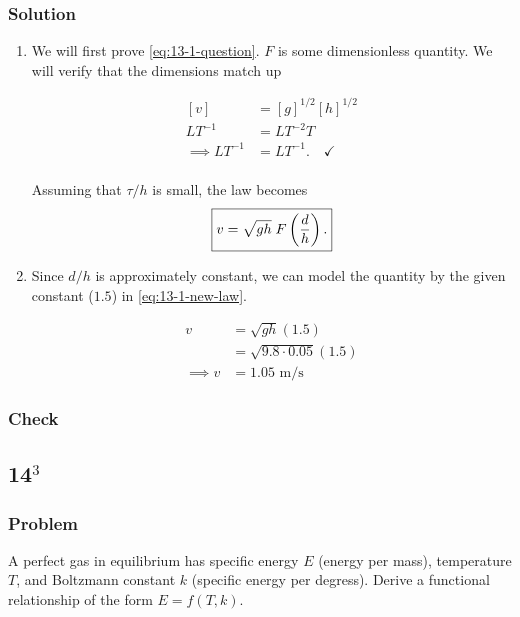 \documentclass[12pt]{article}
\begin{document}
  \subsubsection*{Solution}
  \begin{enumerate}
  \item We will first prove \cref{eq:13-1-question}. $F$ is some dimensionless
    quantity. We will verify that the dimensions match up

    \begin{equation}
      \begin{aligned}
        [v] &= [g]^{1/2}[h]^{1/2} \\
        LT^{-1} &= LT^{-2}T \\
        \implies LT^{-1} &= LT^{-1}. \quad \checkmark \\
      \end{aligned}
    \end{equation}

    Assuming that $\tau/h$ is small, the law becomes
    \begin{equation} \boxed {
        \label{eq:13-1-new-law}
        v=\sqrt{gh}\; F\left(\frac{d}{h}\right).
      }
    \end{equation}

  \item Since $d/h$ is approximately constant, we can model the quantity by the
    given constant ($1.5$) in \cref{eq:13-1-new-law}.

    \begin{equation} \boxed{
        \begin{aligned}
          v &= \sqrt{gh}(1.5) \\
          &= \sqrt{9.8\cdot0.05}(1.5) \\
          \implies v &= 1.05 \text{ m/s}
        \end{aligned}
      }
    \end{equation}
  \end{enumerate}

  \subsubsection*{Check}
  \todo

\subsection{14$^3$}
  \subsubsection*{Problem}
  A perfect gas in equilibrium has specific energy $E$ (energy per mass),
  temperature $T$, and Boltzmann constant $k$ (specific energy per degress).
  Derive a functional relationship of the form $E=f(T,k)$.
\end{document}
